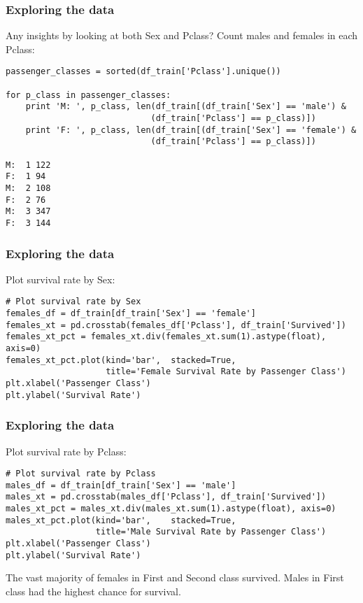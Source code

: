 \begin{frame}[fragile]\frametitle{Exploring  the data}
Any insights by looking at both Sex and Pclass? Count males and females in each Pclass:
\begin{lstlisting}
passenger_classes = sorted(df_train['Pclass'].unique())

for p_class in passenger_classes:
    print 'M: ', p_class, len(df_train[(df_train['Sex'] == 'male') & 
                             (df_train['Pclass'] == p_class)])
    print 'F: ', p_class, len(df_train[(df_train['Sex'] == 'female') & 
                             (df_train['Pclass'] == p_class)])

M:  1 122
F:  1 94
M:  2 108
F:  2 76
M:  3 347
F:  3 144                             
\end{lstlisting}
\end{frame}

\begin{frame}[fragile]\frametitle{Exploring  the data}
Plot survival rate by Sex:
\begin{lstlisting}
# Plot survival rate by Sex
females_df = df_train[df_train['Sex'] == 'female']
females_xt = pd.crosstab(females_df['Pclass'], df_train['Survived'])
females_xt_pct = females_xt.div(females_xt.sum(1).astype(float), axis=0)
females_xt_pct.plot(kind='bar',  stacked=True, 
                    title='Female Survival Rate by Passenger Class')
plt.xlabel('Passenger Class')
plt.ylabel('Survival Rate')
\end{lstlisting}

\end{frame}

\begin{frame}[fragile]\frametitle{Exploring  the data}
Plot survival rate by Pclass:
\begin{lstlisting}
# Plot survival rate by Pclass
males_df = df_train[df_train['Sex'] == 'male']
males_xt = pd.crosstab(males_df['Pclass'], df_train['Survived'])
males_xt_pct = males_xt.div(males_xt.sum(1).astype(float), axis=0)
males_xt_pct.plot(kind='bar',    stacked=True, 
                  title='Male Survival Rate by Passenger Class')
plt.xlabel('Passenger Class')
plt.ylabel('Survival Rate')                      
\end{lstlisting}
The vast majority of females in First and Second class survived. Males in First class had the highest chance for survival.
\end{frame}


